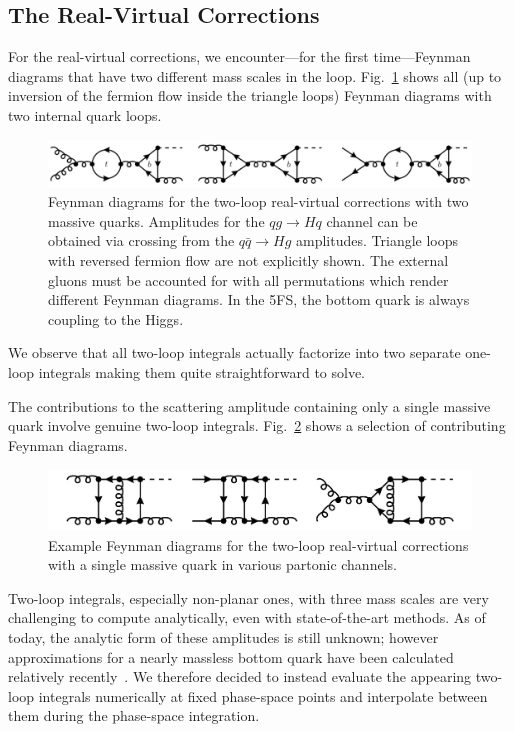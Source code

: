 \subsection{The Real-Virtual Corrections} \label{subsec:5:the_real-virtual_corrections}
For the real-virtual corrections, we encounter---for the first time---Feynman diagrams that have two different mass scales in the loop. Fig.~\ref{fig:5:real_virtual2} shows all (up to inversion of the fermion flow inside the triangle loops) Feynman diagrams with two internal quark loops.
\begin{figure}[h]
  \centering
  \includegraphics[width=\textwidth]{Images/NNLO_Feynman_diagrams/RealVirtual2.pdf}
  \caption{Feynman diagrams for the two-loop real-virtual corrections with two massive quarks. Amplitudes for the $qg \rightarrow Hq$ channel can be obtained via crossing from the $q \bar{q} \rightarrow H g$ amplitudes. Triangle loops with reversed fermion flow are not explicitly shown. The external gluons must be accounted for with all permutations which render different Feynman diagrams. In the 5\acs{FS}, the bottom quark is always coupling to the Higgs.}
  \label{fig:5:real_virtual2}
\end{figure}
We observe that all two-loop integrals actually factorize into two separate one-loop integrals making them quite straightforward to solve.

The contributions to the scattering amplitude containing only a single massive quark involve genuine two-loop integrals. Fig.~\ref{fig:5:real_virtual1} shows a selection of contributing Feynman diagrams.
\begin{figure}[h]
  \centering
  \includegraphics[width=\figurewidth]{Images/NNLO_Feynman_diagrams/RealVirtual1.pdf}
  \caption{Example Feynman diagrams for the two-loop real-virtual corrections with a single massive quark in various partonic channels.}
  \label{fig:5:real_virtual1}
\end{figure}
Two-loop integrals, especially non-planar ones, with three mass scales are very challenging to compute analytically, even with state-of-the-art methods. As of today, the analytic form of these amplitudes is still unknown; however approximations for a nearly massless bottom quark have been calculated relatively recently~\cite{Melnikov:2016qoc, Melnikov:2017pgf}. We therefore decided to instead evaluate the appearing two-loop integrals numerically at fixed phase-space points and interpolate between them during the phase-space integration.

